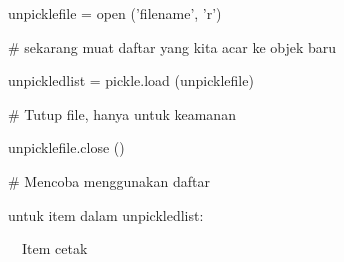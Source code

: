\documentclass[a4paper,12pt]{report}
\begin{document}
{\fontsize{10pt}{10pt}\selectfont unpicklefile = open ('filename', 'r')} \par
\noindent 
\vspace{10pt}
\noindent 
{\fontsize{10pt}{10pt}\selectfont  $  \#  $ sekarang muat daftar yang kita acar ke objek baru} \par
\noindent 
{\fontsize{10pt}{10pt}\selectfont unpickledlist = pickle.load (unpicklefile)} \par
\noindent 
\vspace{10pt}
\noindent 
{\fontsize{10pt}{10pt}\selectfont  $  \#  $ Tutup file, hanya untuk keamanan} \par
\noindent 
{\fontsize{10pt}{10pt}\selectfont unpicklefile.close ()} \par
\noindent 
\vspace{10pt}
\noindent 
{\fontsize{10pt}{10pt}\selectfont  $  \#  $ Mencoba menggunakan daftar} \par
\noindent 
{\fontsize{10pt}{10pt}\selectfont untuk item dalam unpickledlist:} \par
\noindent 
{\fontsize{10pt}{10pt}\selectfont  $  $ $  $ $  $ $  $Item cetak} \par
\vspace{14pt}
\end{document}
